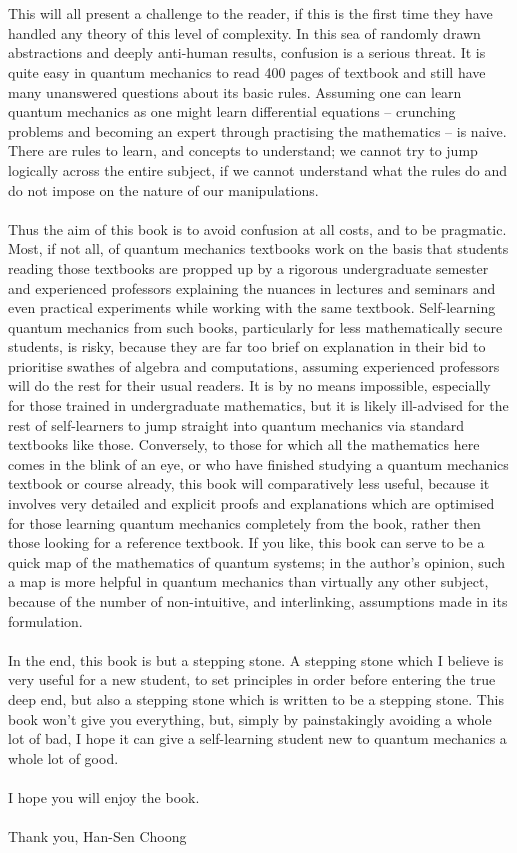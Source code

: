 \\\\
This will all present a challenge to the reader, if this is the first time they have handled any theory of this level of complexity. In this sea of randomly drawn abstractions and deeply anti-human results, confusion is a serious threat. It is quite easy in quantum mechanics to read 400 pages of textbook and still have many unanswered questions about its basic rules. Assuming one can learn quantum mechanics as one might learn differential equations -- crunching problems and becoming an expert through practising the mathematics -- is naive. There are rules to learn, and concepts to understand; we cannot try to jump logically across the entire subject, if we cannot understand what the rules do and do not impose on the nature of our manipulations.
\\\\
Thus the aim of this book is to avoid confusion at all costs, and to be pragmatic. Most, if not all, of quantum mechanics textbooks work on the basis that students reading those textbooks are propped up by a rigorous undergraduate semester and experienced professors explaining the nuances in lectures and seminars and even practical experiments while working with the same textbook. Self-learning quantum mechanics from such books, particularly for less mathematically secure students, is risky, because they are far too brief on explanation in their bid to prioritise swathes of algebra and computations, assuming experienced professors will do the rest for their usual readers. It is by no means impossible, especially for those trained in undergraduate mathematics, but it is likely ill-advised for the rest of self-learners to jump straight into quantum mechanics via standard textbooks like those. Conversely, to those for which all the mathematics here comes in the blink of an eye, or who have finished studying a quantum mechanics textbook or course already, this book will comparatively less useful, because it involves very detailed and explicit proofs and explanations which are optimised for those learning quantum mechanics completely from the book, rather then those looking for a reference textbook. If you like, this book can serve to be a quick map of the mathematics of quantum systems; in the author's opinion, such a map is more helpful in quantum mechanics than virtually any other subject, because of the number of non-intuitive, and interlinking, assumptions made in its formulation.
\\\\
In the end, this book is but a stepping stone. A stepping stone which I believe is very useful for a new student, to set principles in order before entering the true deep end, but also a stepping stone which is written to be a stepping stone. This book won't give you everything, but, simply by painstakingly avoiding a whole lot of bad, I hope it can give a self-learning student new to quantum mechanics a whole lot of good.
\\\\
I hope you will enjoy the book.
\\\\
Thank you,
Han-Sen Choong
